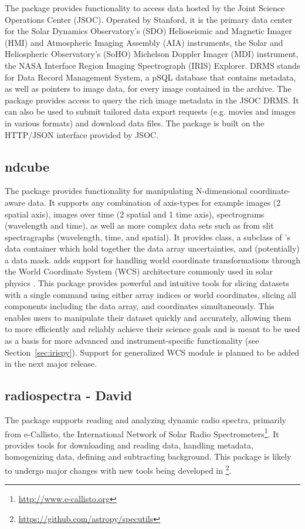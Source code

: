 The  package provides functionality to access data hosted by the Joint Science Operations Center (JSOC).
Operated by Stanford, it is the primary data center for the Solar Dynamics Observatory’s (SDO) Helioseismic and Magnetic Imager (HMI) and Atmospheric Imaging Assembly (AIA) instruments, the Solar and Heliospheric Observatory's (SoHO) Michelson Doppler Imager (MDI) instrument, the NASA Interface Region Imaging Spectrograph (IRIS) Explorer.
DRMS stands for Data Record Management System, a pSQL database that contains metadata, as well as pointers to image data, for every image contained in the archive.
The  package provides access to query the rich image metadata in the JSOC DRMS. It can also be used to submit tailored data export requests (e.g. movies and images in various formats) and download data files.
The package is built on the HTTP/JSON interface provided by JSOC.

\subsection{ndcube}
\label{sec:ndcube}

The  package provides functionality for manipulating N-dimensional coordinate-aware data.
It supports any combination of axis-types for example images (2 spatial axis), images over time (2 spatial and 1 time axis), spectrograms (wavelength and time), as well as more complex data sets such as from slit spectragraphs (wavelength, time, and spatial).
It provides  class, a subclass of \astropy's  data container which hold together the data array uncertainties, and (potentially) a data mask.
 adds support for handling world coordinate transformations through the World Coordinate System (WCS) architecture commonly used in solar physics \citep{2002A&A...395.1061G}.
This package provides powerful and intuitive tools for slicing datasets with a single command using either array indices or world coordinates, slicing all components including the data array, and coordinates simultaneously.
This enables users to manipulate their dataset quickly and accurately, allowing them to more efficiently and reliably achieve their science goals and is meant to be used as a basis for more advanced and instrument-specific functionality (see Section~\ref{sec:irispy}).
Support for generalized WCS module \citep{gwcs2018} is planned to be added in the next major release.

\subsection{radiospectra - David}
The  package supports reading and analyzing dynamic radio spectra, primarily from e-Callisto, the International Network of Solar Radio Spectrometers\footnote{\url{http://www.e-callisto.org}}.
It provides tools for downloading and reading data, handling metadata, homogenizing data, defining and subtracting background.
This package is likely to undergo major changes with new tools being developed in \footnote{\url{https://github.com/astropy/specutils}}.

